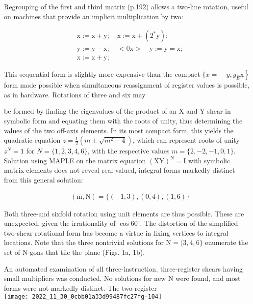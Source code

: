 \begin{CJK}{UTF8}{gbsn}
Regrouping of the first and third matrix (p.192) allows a two-line rotation, useful on machines that provide an implicit multiplication by two:

$$
\begin{aligned}
& \mathrm{x}:=\mathrm{x}+\mathrm{y} ; \quad \mathrm{x}:=\mathrm{x}+\left(2^{*} \mathrm{y}\right) ; \\
& \mathrm{y}:=\mathrm{y}-\mathrm{x} ; \quad<0 \mathrm{x}>\quad \mathrm{y}:=\mathrm{y}=\mathrm{x} ; \\
& \mathrm{x}:=\mathrm{x}+\mathrm{y} \text {; }
\end{aligned}
$$

This sequential form is slightly more expensive than the compact $\{x=$ $\left.-y, y_{\bar{E}} \mathrm{x}\right\}$ form made possible when simultaneous reassignment of register values is possible, as in hardware. Rotations of three and six may

be formed by finding the eigenvalues of the product of an $\mathrm{X}$ and $\mathrm{Y}$ shear in symbolic form and equating them with the roots of unity, thus determining the values of the two off-axis elements. In its most compact form, this yields the quadratic equation $z=\frac{1}{2}\left(m \pm \sqrt{m^{2}-4}\right)$, which can represent roots of unity $z^{N}=1$ for $N=\{1,2,3,4,6\}$, with the respective values $m=\{2,-2,-1,0,1\}$. Solution using MAPLE on the matrix equation $(\mathrm{XY})^{\mathrm{N}}=\mathrm{I}$ with symbolic matrix elements does not reveal real-valued, integral forms markedly distinct from this general solution:

$$
\begin{aligned}
& (\mathrm{m}, \mathrm{N})=\{(-1,3),(0,4),(1,6)\}
\end{aligned}
$$

Both three-and sixfold rotation using unit elements are thus possible. These are unexpected, given the irrationality of $\cos 60^{\circ}$. The distortion of the simplified two-shear rotational form has become a virtue in fixing vertices to integral locations. Note that the three nontrivial solutions for $\mathrm{N}=(3,4,6\}$ enumerate the set of $\mathrm{N}$-gons that tile the plane (Figs. 1a, 1b).

An automated examination of all three-instruction, three-register shears having small multipliers was conducted. No solutions for new $\mathrm{N}$ were found, and most forms were not markedly distinct. The two-register\\
\texttt{[image: 2022\_11\_30\_0cbb01a33d99487fc27fg-104]}


\end{CJK}
